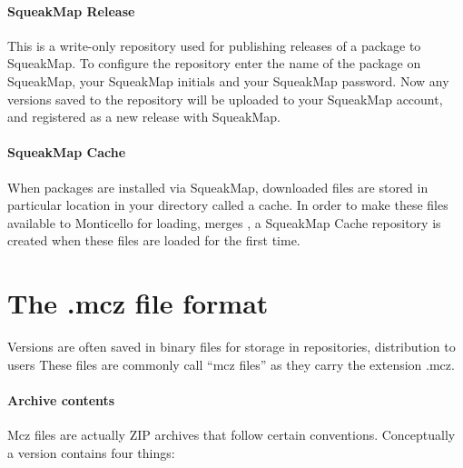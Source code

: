 \documentclass[a4paper,10pt,twoside]{book}
\begin{document}
\paragraph{SqueakMap Release} This is a write-only repository used for publishing releases of a package to SqueakMap. To configure the repository enter the name of the package on SqueakMap, your SqueakMap initials and your SqueakMap password. Now any versions saved to the repository will be uploaded to your SqueakMap account, and registered as a new release with SqueakMap.

\paragraph{SqueakMap Cache} When packages are installed via SqueakMap, downloaded files are stored in particular location in your directory called a cache. In order to make these files available to Monticello for loading, merges \etc, a SqueakMap Cache repository is created when these files are loaded for the first time.




\section{The .mcz file format}

Versions are often saved in binary files for storage in repositories, distribution to users \etc
These files are commonly call ``mcz files'' as they carry the extension .mcz.

\paragraph{Archive contents}

Mcz files are actually ZIP archives that follow certain conventions. Conceptually a version contains four things:
\end{document}
